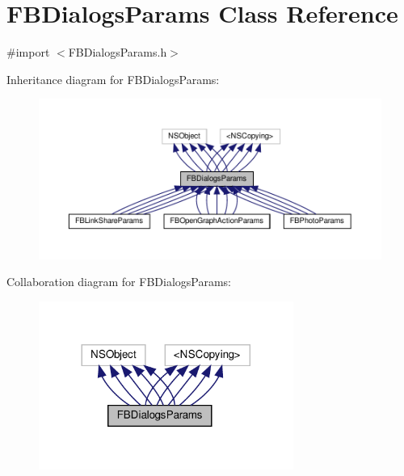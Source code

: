 \hypertarget{interfaceFBDialogsParams}{}\section{F\+B\+Dialogs\+Params Class Reference}
\label{interfaceFBDialogsParams}


{\ttfamily \#import $<$F\+B\+Dialogs\+Params.\+h$>$}



Inheritance diagram for F\+B\+Dialogs\+Params\+:
\nopagebreak
\begin{figure}[H]
\begin{center}
\leavevmode
\includegraphics[width=350pt]{interfaceFBDialogsParams__inherit__graph}
\end{center}
\end{figure}


Collaboration diagram for F\+B\+Dialogs\+Params\+:
\nopagebreak
\begin{figure}[H]
\begin{center}
\leavevmode
\includegraphics[width=236pt]{interfaceFBDialogsParams__coll__graph}
\end{center}
\end{figure}
